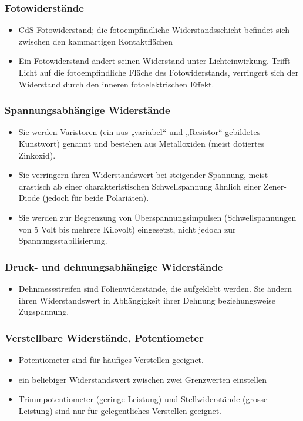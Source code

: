 \subsubsection{Fotowiderstände}
\begin{itemize}
  \item CdS-Fotowiderstand; die fotoempfindliche Widerstandsschicht befindet
  sich zwischen den kammartigen Kontaktflächen
  \item Ein Fotowiderstand ändert seinen Widerstand unter Lichteinwirkung.
  Trifft Licht auf die fotoempfindliche Fläche des Fotowiderstands, verringert
  sich der Widerstand durch den inneren fotoelektrischen Effekt.
\end{itemize}

\subsubsection{Spannungsabhängige Widerstände}
\begin{itemize}
  \item Sie werden Varistoren (ein aus „variabel“ und „Resistor“ gebildetes
  Kunstwort) genannt und bestehen aus Metalloxiden (meist dotiertes Zinkoxid).
  \item Sie verringern ihren Widerstandswert bei steigender Spannung, meist
  drastisch ab einer charakteristischen Schwellspannung ähnlich einer
  Zener-Diode (jedoch für beide Polariäten).
  \item Sie werden zur Begrenzung von Überspannungsimpulsen (Schwellspannungen
  von 5 Volt bis mehrere Kilovolt) eingesetzt, nicht jedoch zur Spannungsstabilisierung.
\end{itemize}

\subsubsection{Druck- und dehnungsabhängige Widerstände}
\begin{itemize}
  \item Dehnmessstreifen sind Folienwiderstände, die aufgeklebt werden. Sie
  ändern ihren Widerstandswert in Abhängigkeit ihrer Dehnung beziehungsweise
  Zugspannung.
\end{itemize}

\subsubsection{Verstellbare Widerstände, Potentiometer}
\begin{itemize}
  \item Potentiometer sind für häufiges Verstellen geeignet.
  \item ein beliebiger Widerstandswert zwischen zwei Grenzwerten einstellen
  \item Trimmpotentiometer (geringe Leistung) und Stellwiderstände (grosse
  Leistung) sind nur für gelegentliches Verstellen geeignet.
\end{itemize}


